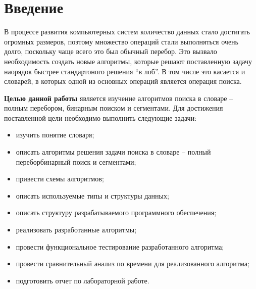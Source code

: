 \chapter*{Введение}

В процессе развития компьютерных систем количество данных стало достигать огромных размеров, поэтому множество операций стали выполняться очень долго, поскольку чаще всего это был обычный перебор. Это вызвало необходимость создать новые алгоритмы, которые решают поставленную задачу наорядок быстрее стандартоного решения “в лоб”. В том числе это касается и словарей, в которых одной из основных операций является операция поиска.


\textbf{Целью данной работы} является изучение алгоритмов поиска в словаре -- полным перебором, бинарным поиском и сегментами.
Для достижения поставленной цели необходимо выполнить следующие задачи:
\begin{itemize}
	\item изучить понятие словаря;
    \item описать алгоритмы решения задачи поиска в словаре -- полный переборбинарный поиск и сегментами;
    \item привести схемы алгоритмов;
    \item описать используемые типы и структуры данных;
    \item описать структуру разрабатываемого программного обеспечения;
    \item реализовать разработанные алгоритмы;
    \item провести функциональное тестирование разработанного алгоритма;
    \item провести сравнительный анализ по времени для реализованного алгоритма;
    \item подготовить отчет по лабораторной работе.
\end{itemize}
